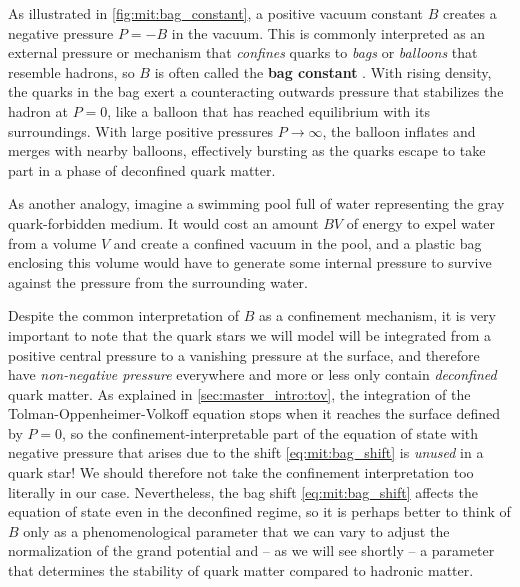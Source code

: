 As illustrated in \cref{fig:mit:bag_constant},
a positive vacuum constant $B$ creates a negative pressure $P = -B$ in the vacuum.
This is commonly interpreted as an external pressure or mechanism that \emph{confines} quarks to \emph{bags} or \emph{balloons} that resemble hadrons,
so $B$ is often called the \textbf{bag constant}%
.
With rising density, the quarks in the bag exert a counteracting outwards pressure that stabilizes the hadron at $P=0$,
like a balloon that has reached equilibrium with its surroundings.
With large positive pressures $P \rightarrow \infty$, the balloon inflates and merges with nearby balloons,
effectively bursting as the quarks escape to take part in a phase of deconfined quark matter.

As another analogy, imagine a swimming pool full of water representing the gray quark-forbidden medium.
It would cost an amount $BV$ of energy to expel water from a volume $V$ and create a confined vacuum in the pool,
and a plastic bag enclosing this volume would have to generate some internal pressure to survive against the pressure from the surrounding water.

Despite the common interpretation of $B$ as a confinement mechanism,
it is very important to note that the quark stars we will model 
will be integrated from a positive central pressure to a vanishing pressure at the surface,
and therefore have \emph{non-negative pressure} everywhere and more or less only contain \emph{deconfined} quark matter.
As explained in \cref{sec:master_intro:tov}, the integration of the Tolman-Oppenheimer-Volkoff equation stops when it reaches the surface defined by $P=0$,
so the confinement-interpretable part of the equation of state with negative pressure that arises due to the shift \eqref{eq:mit:bag_shift} is \emph{unused} in a quark star!
We should therefore not take the confinement interpretation too literally in our case.
Nevertheless, the bag shift \eqref{eq:mit:bag_shift} affects the equation of state even in the deconfined regime,
so it is perhaps better to think of $B$ only as a phenomenological parameter that we can vary to adjust the normalization of the grand potential
and -- as we will see shortly -- a parameter that determines 
the stability of quark matter compared to hadronic matter.

